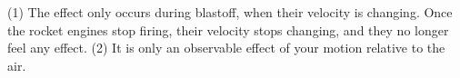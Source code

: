 (1) The effect only occurs during blastoff, when their velocity is
changing. Once the rocket engines stop firing, their velocity stops
changing, and they no longer feel any effect. (2) It is only an
observable effect of your motion relative to the air.
